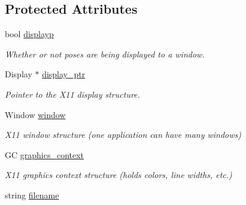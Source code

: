 \subsection*{Protected Attributes}
\begin{DoxyCompactItemize}
\item 
\hypertarget{classPoseDisplay_a5d2e9d3f9caa69c8eb1c348c56ba7a51}{}bool \hyperlink{classPoseDisplay_a5d2e9d3f9caa69c8eb1c348c56ba7a51}{displayp}\label{classPoseDisplay_a5d2e9d3f9caa69c8eb1c348c56ba7a51}

\begin{DoxyCompactList}\small\item\em Whether or not poses are being displayed to a window. \end{DoxyCompactList}\item 
\hypertarget{classPoseDisplay_a9a903a2b1a3d4985bfb36da23e5ae0fc}{}Display $\ast$ \hyperlink{classPoseDisplay_a9a903a2b1a3d4985bfb36da23e5ae0fc}{display\+\_\+ptr}\label{classPoseDisplay_a9a903a2b1a3d4985bfb36da23e5ae0fc}

\begin{DoxyCompactList}\small\item\em Pointer to the X11 display structure. \end{DoxyCompactList}\item 
\hypertarget{classPoseDisplay_a46c88e5385d36c96018000c22178734d}{}Window \hyperlink{classPoseDisplay_a46c88e5385d36c96018000c22178734d}{window}\label{classPoseDisplay_a46c88e5385d36c96018000c22178734d}

\begin{DoxyCompactList}\small\item\em X11 window structure (one application can have many windows) \end{DoxyCompactList}\item 
\hypertarget{classPoseDisplay_afccdac510a02e9447f54cdb896cf3c75}{}G\+C \hyperlink{classPoseDisplay_afccdac510a02e9447f54cdb896cf3c75}{graphics\+\_\+context}\label{classPoseDisplay_afccdac510a02e9447f54cdb896cf3c75}

\begin{DoxyCompactList}\small\item\em X11 graphics context structure (holds colors, line widths, etc.) \end{DoxyCompactList}\item 
\hypertarget{classPoseDisplay_a4c736f7ac4b51817117c61daaf278937}{}string \hyperlink{classPoseDisplay_a4c736f7ac4b51817117c61daaf278937}{filename}\label{classPoseDisplay_a4c736f7ac4b51817117c61daaf278937}


\end{DoxyCompactItemize}
